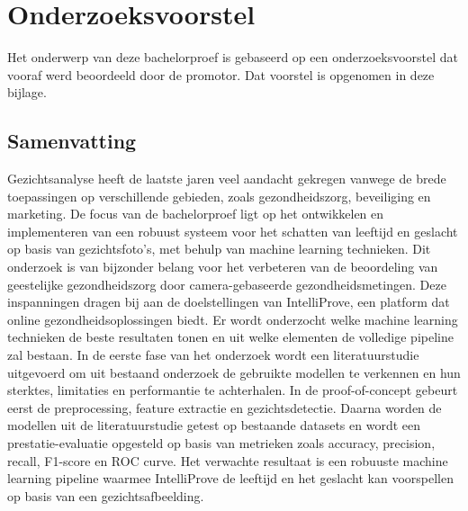\documentclass[dutch,dit,thesis]{hogentreport}
\begin{document}
    
    
    
    
    
    
    
    
    
    
    
    
    \appendix
    
    \chapter{Onderzoeksvoorstel}
    
    Het onderwerp van deze bachelorproef is gebaseerd op een onderzoeksvoorstel dat vooraf werd beoordeeld door de promotor. Dat voorstel is opgenomen in deze bijlage.
    
    \section*{Samenvatting}
    
    Gezichtsanalyse heeft de laatste jaren veel aandacht gekregen vanwege de brede toepassingen op verschillende gebieden, zoals gezondheidszorg, beveiliging en marketing.  
    De focus van de bachelorproef ligt op het ontwikkelen en implementeren van een robuust systeem voor het schatten van leeftijd en geslacht op basis van gezichtsfoto’s, met behulp van machine learning technieken. Dit onderzoek is van bijzonder belang voor het verbeteren van de beoordeling van geestelijke gezondheidszorg door camera-gebaseerde gezondheidsmetingen. Deze inspanningen dragen bij aan de doelstellingen van IntelliProve, een platform dat online gezondheidsoplossingen biedt. Er wordt onderzocht welke machine learning technieken de beste resultaten tonen en uit welke elementen de volledige pipeline zal bestaan.   
    In de eerste fase van het onderzoek wordt een literatuurstudie uitgevoerd om uit bestaand onderzoek de gebruikte modellen te verkennen en hun sterktes, limitaties en performantie te achterhalen. In de proof-of-concept gebeurt eerst de preprocessing, feature extractie en gezichtsdetectie. Daarna worden de modellen uit de literatuurstudie getest op bestaande datasets en wordt een prestatie-evaluatie opgesteld op basis van metrieken zoals accuracy, precision, recall, F1-score en ROC curve. Het verwachte resultaat is een robuuste machine learning pipeline waarmee IntelliProve de leeftijd en het geslacht kan voorspellen op basis van een gezichtsafbeelding. 
    
\end{document}
